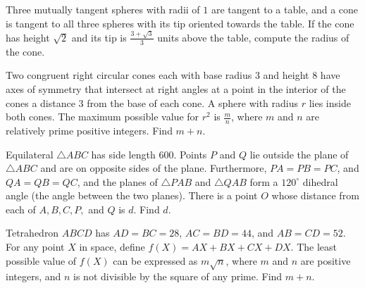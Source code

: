 \documentclass[mast]{lucky}
\begin{document}
\begin{req}[NARML 10]{9}
Three mutually tangent spheres with radii of $1$ are tangent to a table, and a cone is tangent to all three spheres with its tip oriented towards the table. If the cone has height $\sqrt{2}$ and its tip is $\tfrac{3+\sqrt{3}}{3}$ units above the table, compute the radius of the cone.
\end{req}

\begin{prob}[AIME II 2020/7]{9}
Two congruent right circular cones each with base radius $3$ and height $8$ have axes of symmetry that intersect at right angles at a point in the interior of the cones a distance $3$ from the base of each cone. A sphere with radius $r$ lies inside both cones. The maximum possible value for $r^2$ is $\frac mn$, where $m$ and $n$ are relatively prime positive integers. Find $m+n$.
\end{prob}


\begin{prob}[AIME II 2016/14]{13}
Equilateral $\triangle ABC$ has side length $600$. Points $P$ and $Q$ lie outside the plane of $\triangle ABC$ and are on opposite sides of the plane. Furthermore, $PA=PB=PC$, and $QA=QB=QC$, and the planes of $\triangle PAB$ and $\triangle QAB$ form a $120^{\circ}$ dihedral angle (the angle between the two planes). There is a point $O$ whose distance from each of $A,B,C,P,$ and $Q$ is $d$. Find $d$.
\end{prob}

\begin{prob}[AIME II 2017/15]{13}
Tetrahedron $ABCD$ has $AD=BC=28$, $AC=BD=44$, and $AB=CD=52$. For any point $X$ in space, define $f(X)=AX+BX+CX+DX$. The least possible value of $f(X)$ can be expressed as $m\sqrt{n}$, where $m$ and $n$ are positive integers, and $n$ is not divisible by the square of any prime. Find $m+n$.
\end{prob}
\end{document}
